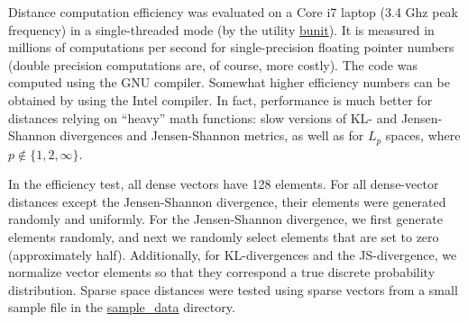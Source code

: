 \documentclass[runningheads,a4paper]{llncs}
\begin{document}
Distance computation efficiency was evaluated on a Core i7 laptop (3.4 Ghz peak frequency)
in a single-threaded mode (by the utility \href{https://github.com/searchivarius/NonMetricSpaceLib/blob/master/similarity_search/test/bunit.cc}{bunit}).
It is measured in millions of computations per second for single-precision
floating pointer numbers (double precision computations are, of course, more costly). 
The code was computed using the GNU compiler. 
Somewhat higher efficiency numbers can be obtained by using the Intel compiler.
In fact, performance is much better for distances relying on ``heavy'' math functions:
slow versions of KL- and Jensen-Shannon divergences and Jensen-Shannon metrics, 
as well as for $L_p$ spaces,
where $p \not\in\{1,2,\infty\}$.

In the efficiency test, all dense vectors have 128 elements.
For all dense-vector distances except the Jensen-Shannon divergence,
their elements were generated randomly and uniformly.
For the Jensen-Shannon divergence, we first generate elements randomly,
and next we randomly select elements that are set to zero (approximately half). 
Additionally, for KL-divergences and the JS-divergence,
we normalize vector elements so that they correspond a true discrete probability distribution. 
Sparse space distances were tested using sparse vectors from a small sample file in the
\href{https://github.com/searchivarius/NonMetricSpaceLib/blob/master/sample_data/sparse_5K.txt}{sample\_data} directory.
\end{document}
